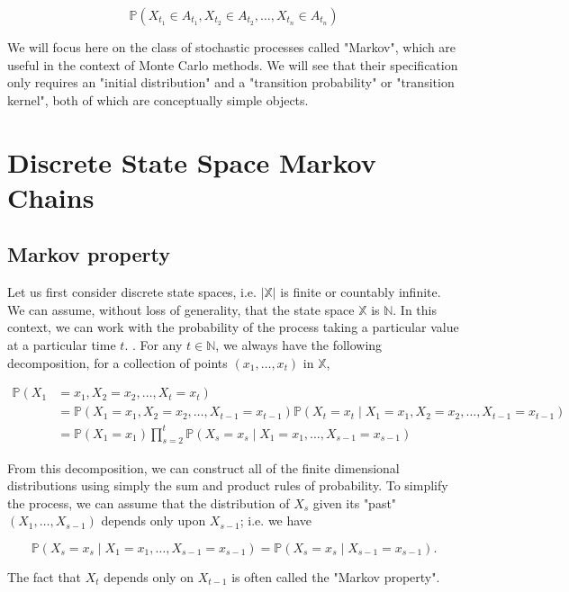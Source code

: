 \documentclass[10pt]{article}
\begin{document}
$$
\mathbb{P}\left(X_{t_{1}} \in A_{t_{1}}, X_{t_{2}} \in A_{t_{2}}, \ldots, X_{t_{n}} \in A_{t_{n}}\right)
$$

We will focus here on the class of stochastic processes called "Markov", which are useful in the context of Monte Carlo methods. We will see that their specification only requires an "initial distribution" and a "transition probability" or "transition kernel", both of which are conceptually simple objects.

\section{Discrete State Space Markov Chains}
\subsection{Markov property}
Let us first consider discrete state spaces, i.e. $|\mathbb{X}|$ is finite or countably infinite. We can assume, without loss of generality, that the state space $\mathbb{X}$ is $\mathbb{N}$. In this context, we can work with the probability of the process taking a particular value at a particular time $t$. . For any $t \in \mathbb{N}$, we always have the following decomposition, for a collection of points $\left(x_{1}, \ldots, x_{t}\right)$ in $\mathbb{X}$,

$$
\begin{aligned}
\mathbb{P}\left(X_{1}\right. & \left.=x_{1}, X_{2}=x_{2}, \ldots, X_{t}=x_{t}\right) \\
& =\mathbb{P}\left(X_{1}=x_{1}, X_{2}=x_{2}, \ldots, X_{t-1}=x_{t-1}\right) \mathbb{P}\left(X_{t}=x_{t} \mid X_{1}=x_{1}, X_{2}=x_{2}, \ldots, X_{t-1}=x_{t-1}\right) \\
& =\mathbb{P}\left(X_{1}=x_{1}\right) \prod_{s=2}^{t} \mathbb{P}\left(X_{s}=x_{s} \mid X_{1}=x_{1}, \ldots, X_{s-1}=x_{s-1}\right)
\end{aligned}
$$

From this decomposition, we can construct all of the finite dimensional distributions using simply the sum and product rules of probability. To simplify the process, we can assume that the distribution of $X_{s}$ given its "past" $\left(X_{1}, \ldots, X_{s-1}\right)$ depends only upon $X_{s-1}$; i.e. we have

$$
\mathbb{P}\left(X_{s}=x_{s} \mid X_{1}=x_{1}, \ldots, X_{s-1}=x_{s-1}\right)=\mathbb{P}\left(X_{s}=x_{s} \mid X_{s-1}=x_{s-1}\right) .
$$

The fact that $X_{t}$ depends only on $X_{t-1}$ is often called the "Markov property".
\end{document}
